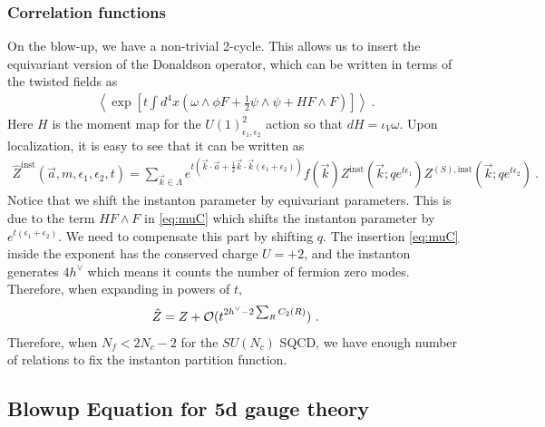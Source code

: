 \documentclass[letterpaper, 11pt]{article}
\def\CO{{\cal O}}
\def\e{\epsilon}
\def\i{\iota}
\def\half{\frac{1}{2}}
\begin{document}
\subsubsection{Correlation functions}
On the blow-up, we have a non-trivial 2-cycle. This allows us to insert the equivariant version of the Donaldson operator, which can be written in terms of the twisted fields as
\begin{align} \label{eq:muC}
 \left\langle \exp \left[ t \int d^4 x \left( \omega \wedge \phi F + \half \psi \wedge \psi + H F \wedge F \right) \right] \right\rangle \ . 
\end{align}
Here $H$ is the moment map for the $U(1)^2_{\e_1, \e_2}$ action so that $dH = \i_{V} \omega$. Upon localization, it is easy to see that it can be written as
\begin{align}
 \hat{Z}^{\textrm{inst}}(\vec{a}, m, \e_1, \e_2, t) = \sum_{\vec{k} \in \Lambda} e^{ t \left( \vec{k} \cdot \vec{a} + \half \vec{k}\cdot \vec{k} (\e_1 + \e_2) \right) } f(\vec{k}) Z^{\textrm{inst}}(\vec{k}; q e^{t \e_1} ) Z^{(S), \textrm{inst}}(\vec{k} ; q e^{t \e_2}) \ . 
\end{align} 
Notice that we shift the instanton parameter by equivariant parameters. This is due to the term $H F\wedge F$ in \eqref{eq:muC} which shifts the instanton parameter by $e^{t(\e_1+\e_2)}$. We need to compensate this part by shifting $q$. 
The insertion \eqref{eq:muC} inside the exponent has the conserved charge $U=+2$, and the instanton generates $4h^\vee$ which means it counts the number of fermion zero modes. Therefore, when expanding in powers of $t$, 
\begin{align}
\hat{Z} = Z + \CO(t^{2h^\vee - 2\sum_R C_2(R)})  \ . 
\end{align}
Therefore, when $N_f < 2N_c - 2$ for the $SU(N_c)$ SQCD, we have enough number of relations to fix the instanton partition function. 


\subsection{Blowup Equation for 5d gauge theory} 
\end{document}
